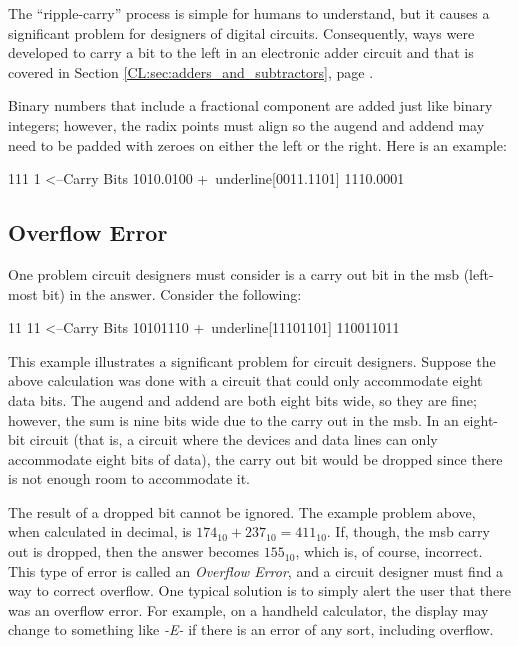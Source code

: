 The ``ripple-carry'' process is simple for humans to understand, but it causes a significant problem for designers of digital circuits. Consequently, ways were developed to carry a bit to the left in an electronic adder circuit and that is covered in Section \ref{CL:sec:adders_and_subtractors}, page \pageref{CL:sec:adders_and_subtractors}.

Binary numbers that include a fractional component are added just like binary integers; however, the radix points must align so the augend and addend may need to be padded with zeroes on either the left or the right. Here is an example: 

\begin{binDisp}[commandchars=~\[\]]
       111 1    <--Carry Bits
      1010.0100
     +~underline[0011.1101]
      1110.0001
\end{binDisp}

\subsection{Overflow Error}
\label{MO:sub:overflow_error}

One problem circuit designers must consider is a carry out bit in the \gls{msb} (left-most bit) in the answer. Consider the following:

\begin{binDisp}[commandchars=~\[\]]
      11 11    <--Carry Bits
      10101110
     +~underline[11101101]
     110011011
\end{binDisp}

This example illustrates a significant problem for circuit designers. Suppose the above calculation was done with a circuit that could only accommodate eight data bits. The augend and addend are both eight bits wide, so they are fine; however, the sum is nine bits wide due to the carry out in the \gls{msb}. In an eight-bit circuit (that is, a circuit where the devices and data lines can only accommodate eight bits of data), the carry out bit would be dropped since there is not enough room to accommodate it.

The result of a dropped bit cannot be ignored. The example problem above, when calculated in decimal, is $ 174_{10} + 237_{10} = 411_{10} $. If, though, the \gls{msb} carry out is dropped, then the answer becomes $ 155_{10} $, which is, of course, incorrect. This type of error is called an \emph{Overflow Error}, and a circuit designer must find a way to correct overflow. One typical solution is to simply alert the user that there was an overflow error. For example, on a handheld calculator, the display may change to something like \emph{-E-} if there is an error of any sort, including overflow. 

